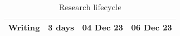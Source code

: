 \begin{table}[h]
\begin{tabular}{ |l||c|c|c| }
    \hline
    \hline\rowcolor{gray!10}

    \textbf{Writing} & 3 days & 04 Dec 23 & 06 Dec 23 \\


    \hline
  \end{tabular}
  \caption{Research lifecycle}
  \label{fig:research_lifecycle}%
\end{table}
